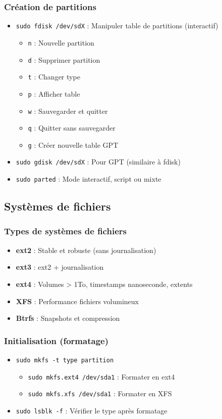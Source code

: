 \documentclass[12pt,a4paper]{article}
\begin{document}
\subsubsection{Création de partitions}
\begin{itemize}
    \item \texttt{sudo fdisk /dev/sdX} : Manipuler table de partitions (interactif)
    \begin{itemize}
        \item \texttt{n} : Nouvelle partition
        \item \texttt{d} : Supprimer partition
        \item \texttt{t} : Changer type
        \item \texttt{p} : Afficher table
        \item \texttt{w} : Sauvegarder et quitter
        \item \texttt{q} : Quitter sans sauvegarder
        \item \texttt{g} : Créer nouvelle table GPT
    \end{itemize}
    \item \texttt{sudo gdisk /dev/sdX} : Pour GPT (similaire à fdisk)
    \item \texttt{sudo parted} : Mode interactif, script ou mixte
\end{itemize}

\subsection{Systèmes de fichiers}

\subsubsection{Types de systèmes de fichiers}
\begin{itemize}
    \item \textbf{ext2} : Stable et robuste (sans journalisation)
    \item \textbf{ext3} : ext2 + journalisation
    \item \textbf{ext4} : Volumes > 1To, timestamps nanoseconde, extents
    \item \textbf{XFS} : Performance fichiers volumineux
    \item \textbf{Btrfs} : Snapshots et compression
\end{itemize}

\subsubsection{Initialisation (formatage)}
\begin{itemize}
    \item \texttt{sudo mkfs -t type partition}
    \begin{itemize}
        \item \texttt{sudo mkfs.ext4 /dev/sda1} : Formater en ext4
        \item \texttt{sudo mkfs.xfs /dev/sda1} : Formater en XFS
    \end{itemize}
    \item \texttt{sudo lsblk -f} : Vérifier le type après formatage
\end{itemize}
\end{document}
